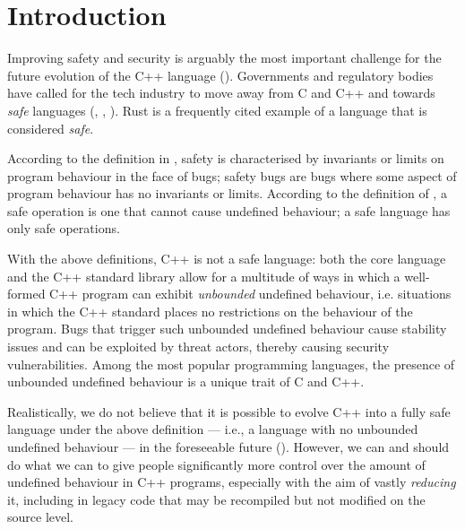 
\tableofcontents*
\pagebreak





\section{Introduction}
\label{intro}

Improving safety and security is arguably the most important challenge for the future evolution of the C++ language (\cite{Bastien2023}). Governments and regulatory bodies have called for the tech industry to move away from C and C++ and towards \emph{safe} languages (\cite{NSA2022}, \cite{CR2023}, \cite{CISA2023}). Rust is a frequently cited example of a language that is considered \emph{safe}.

According to the definition in \cite{Carruth2023}, safety is characterised by invariants or limits on program behaviour in the face of bugs; safety bugs are bugs where some aspect of program behaviour has no invariants or limits. According to the definition of \cite{Abrahams2023}, a safe operation is one that cannot cause undefined behaviour; a safe language has only safe operations.

With the above definitions, C++ is not a safe language: both the core language and the C++ standard library allow for a multitude of ways in which a well-formed C++ program can exhibit \emph{unbounded} undefined behaviour, i.e. situations in which the C++ standard places no restrictions on the behaviour of the program. Bugs that trigger such unbounded undefined behaviour cause stability issues and can be exploited by threat actors, thereby causing security vulnerabilities. Among the most popular programming languages, the presence of unbounded undefined behaviour is a unique trait of C and C++. 

Realistically, we do not believe that it is possible to evolve C++ into a fully safe language under the above definition --- i.e., a language with no unbounded undefined behaviour --- in the foreseeable future (\cite{Doumler2023}). However, we can and should do what we can to give people significantly more control over the amount of undefined behaviour in C++ programs, especially with the aim of vastly \emph{reducing} it, including in legacy code that may be recompiled but not modified on the source level.

